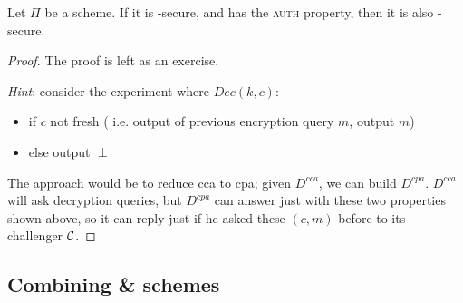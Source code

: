 \begin{theorem}
    Let $\Pi$ be a \ske{} scheme. If it is \cpa-secure, and has the \textsc{auth} property, then it is also \cca-secure.
\end{theorem}

\begin{proof} The proof is left as an exercise.

    \emph{Hint}: consider the experiment where $Dec(k, c)$:

    \begin{itemize}
        \item if $c$ not fresh ( i.e. output of previous encryption query $m$, output $m$)
        \item else output $\perp$
    \end{itemize}
    
    The approach would be to reduce cca to cpa; given $D^{cca}$, we can build $D^{cpa}$. $D^{cca}$ will ask decryption queries, but $D^{cpa}$ can answer just with these two properties shown above, so it can reply just if he asked these $(c, m)$ before to its challenger $\mathcal{C}$.

\end{proof}

\subsection{Combining \ske{} \& \mac{} schemes}

